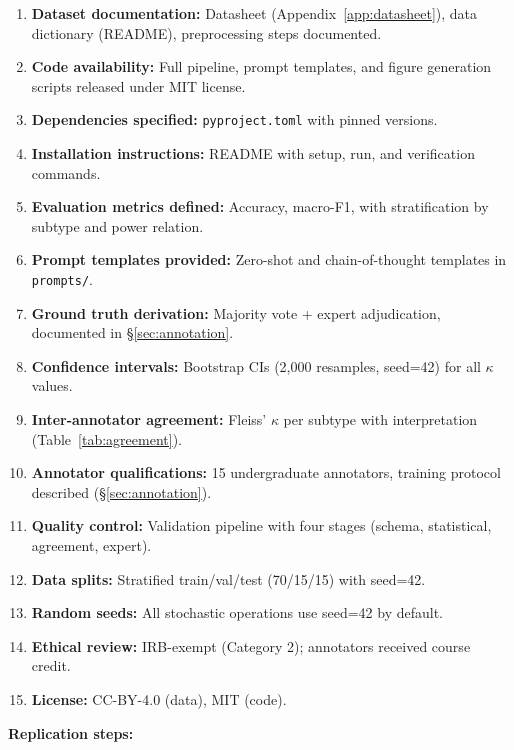 \documentclass[twoside,11pt]{article}
\begin{document}
\begin{enumerate}[leftmargin=*,noitemsep]
    \item \textbf{Dataset documentation:} Datasheet (Appendix~\ref{app:datasheet}), data dictionary (README), preprocessing steps documented. \checkmark
    \item \textbf{Code availability:} Full pipeline, prompt templates, and figure generation scripts released under MIT license. \checkmark
    \item \textbf{Dependencies specified:} \texttt{pyproject.toml} with pinned versions. \checkmark
    \item \textbf{Installation instructions:} README with setup, run, and verification commands. \checkmark
    \item \textbf{Evaluation metrics defined:} Accuracy, macro-F1, with stratification by subtype and power relation. \checkmark
    \item \textbf{Prompt templates provided:} Zero-shot and chain-of-thought templates in \texttt{prompts/}. \checkmark
    \item \textbf{Ground truth derivation:} Majority vote + expert adjudication, documented in \S\ref{sec:annotation}. \checkmark
    \item \textbf{Confidence intervals:} Bootstrap CIs (2,000 resamples, seed=42) for all $\kappa$ values. \checkmark
    \item \textbf{Inter-annotator agreement:} Fleiss' $\kappa$ per subtype with interpretation (Table~\ref{tab:agreement}). \checkmark
    \item \textbf{Annotator qualifications:} 15 undergraduate annotators, training protocol described (\S\ref{sec:annotation}). \checkmark
    \item \textbf{Quality control:} Validation pipeline with four stages (schema, statistical, agreement, expert). \checkmark
    \item \textbf{Data splits:} Stratified train/val/test (70/15/15) with seed=42. \checkmark
    \item \textbf{Random seeds:} All stochastic operations use seed=42 by default. \checkmark
    \item \textbf{Ethical review:} IRB-exempt (Category 2); annotators received course credit. \checkmark
    \item \textbf{License:} CC-BY-4.0 (data), MIT (code). \checkmark
\end{enumerate}

\noindent\textbf{Replication steps:}
\end{document}
